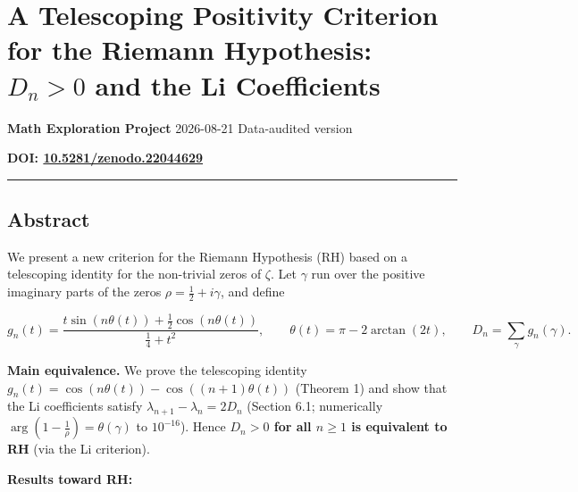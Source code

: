 \documentclass[
]{article}
\author{}
\date{}
\begin{document}
\hypertarget{a-telescoping-positivity-criterion-for-the-riemann-hypothesis-d_n-0-and-the-li-coefficients}{%
\section{\texorpdfstring{A Telescoping Positivity Criterion for the
Riemann Hypothesis: \(D_n > 0\) and the Li
Coefficients}{A Telescoping Positivity Criterion for the Non-trivial Zeros of the Riemann Zeta Function: D\_n \textgreater{} 0 and the Li Coefficients}}\label{a-telescoping-positivity-criterion-for-the-riemann-hypothesis-d_n-0-and-the-li-coefficients}}

\textbf{Math Exploration Project} \textbar{} 2026-08-21 \textbar{}
Data-audited version

\textbf{DOI:
\href{https://doi.org/10.5281/zenodo.22044629}{10.5281/zenodo.22044629}}

\begin{center}\rule{0.5\linewidth}{0.5pt}\end{center}

\hypertarget{abstract}{%
\subsection{Abstract}\label{abstract}}

We present a new criterion for the Riemann Hypothesis (RH) based on a
telescoping identity for the non-trivial zeros of \(\zeta\). Let
\(\gamma\) run over the positive imaginary parts of the zeros
\(\rho = \tfrac12+i\gamma\), and define

\[g_n(t) = \frac{t\sin(n\theta(t)) + \tfrac12\cos(n\theta(t))}{\tfrac14 + t^2}, \qquad \theta(t) = \pi - 2\arctan(2t), \qquad D_n = \sum_\gamma g_n(\gamma).\]

\textbf{Main equivalence.} We prove the telescoping identity
\(g_n(t) = \cos(n\theta(t))-\cos((n+1)\theta(t))\) (Theorem 1) and show
that the Li coefficients satisfy \(\lambda_{n+1}-\lambda_n = 2D_n\)
(Section 6.1; numerically \(\arg(1-\tfrac1\rho)=\theta(\gamma)\) to
\(10^{-16}\)). Hence \textbf{\(D_n > 0\) for all \(n \ge 1\) is
equivalent to RH} (via the Li criterion).

\textbf{Results toward RH:}
\end{document}
